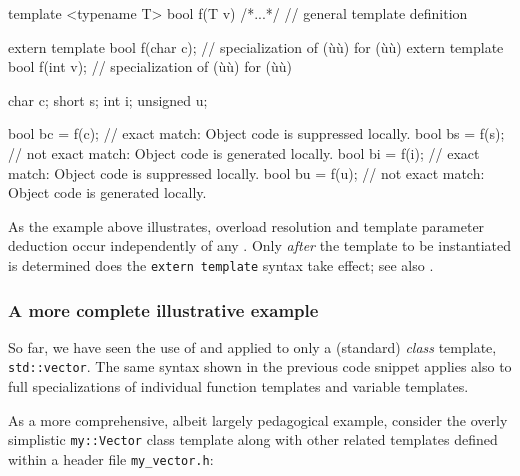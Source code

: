 \begin{emcppslisting}
template <typename T> bool f(T v) {/*...*/}  // general template definition

extern template bool f(char c);  // specialization of (ù{}ù) for (ù{}ù)
extern template bool f(int v);   // specialization of (ù{}ù) for (ù{}ù)

char     c;
short    s;
int      i;
unsigned u;

bool bc = f(c);  // exact match: Object code is suppressed locally.
bool bs = f(s);  // not exact match: Object code is generated locally.
bool bi = f(i);  // exact match: Object code is suppressed locally.
bool bu = f(u);  // not exact match: Object code is generated locally.
\end{emcppslisting}

\noindent As the example above illustrates, overload resolution and template
parameter deduction occur independently of any
. Only \emph{after}
the template to be instantiated is determined does the
\lstinline!extern!~\lstinline!template! syntax take effect; see also .

\subsubsection[A more complete illustrative example]{A more complete illustrative example}\label{a-more-complete-illustrative-example}

So far, we have seen the use of  and  applied to only a
(standard) \emph{class} template, \lstinline!std::vector!. The same syntax
shown in the previous code snippet applies also to full specializations of individual
function templates and variable templates. %

As a more comprehensive, albeit largely pedagogical example, consider
the overly simplistic \lstinline!my::Vector! class template along with
other related templates defined within a header file
\lstinline!my_vector.h!:

